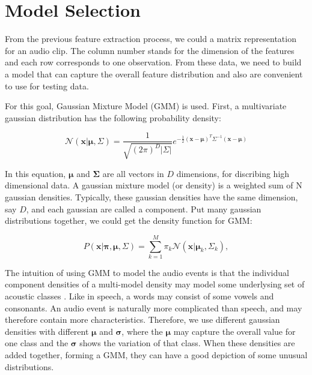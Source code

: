 
\section{Model Selection}
From the previous feature extraction process, we could a matrix representation for an audio clip. 
The column number stands for the dimension of the features and each row corresponds to one observation. 
From these data, we need to build a model that can capture the overall feature distribution and also are convenient to use for testing data.

For this goal, Gaussian Mixture Model (GMM) is used. 
First, a multivariate gaussian distribution has the following probability density:

\begin{equation}
 \mathcal{N}(\mathbf{x}| \mathbf{\mu}, \Sigma) = 
\frac{1}{\sqrt{(2\pi)^D|\Sigma|}}e^{-\frac{1}{2}(\mathbf{x}-\mathbf{\mu})^T \Sigma^{-1} (\mathbf{x}-\mathbf{\mu})}
\end{equation}

In this equation, $\mathbf{\mu}$ and $\mathbf{\Sigma}$ are all vectors in $D$ dimensions, for discribing high dimensional data. 
A gaussian mixture model (or density) is a weighted sum of N gaussian densities. 
Typically, these gaussian densities have the same dimension, say $D$, and each gaussian are called a component.  
Put many gaussian distributions together, we could get the density function for GMM: 

\begin{equation}
P(\mathbf{x}|\mathbf{\pi},\mathbf{\mu},\Sigma) = \sum_{k = 1}^{M} \pi_k
\mathcal{N}(\mathbf{x}|\mathbf{\mu}_k, \Sigma_k),
\end{equation} 

The intuition of using GMM to model the audio events is that the individual component densities of a multi-model density may model some underlysing set of acoustic classes \cite{reynolds1995robust}. 
Like in speech, a words may consist of some vowels and consonants. 
An audio event is naturally more complicated than speech, and may therefore contain more characteristics. 
Therefore, we use different gaussian densities with different $\mathbf{\mu}$ and $\mathbf\sigma$, where the $\mathbf\mu$ may capture the overall value for one class and the $\mathbf\sigma$ shows the variation of that class.  
When these densities are added together, forming a GMM, they can have a good depiction of some unusual distributions. 

